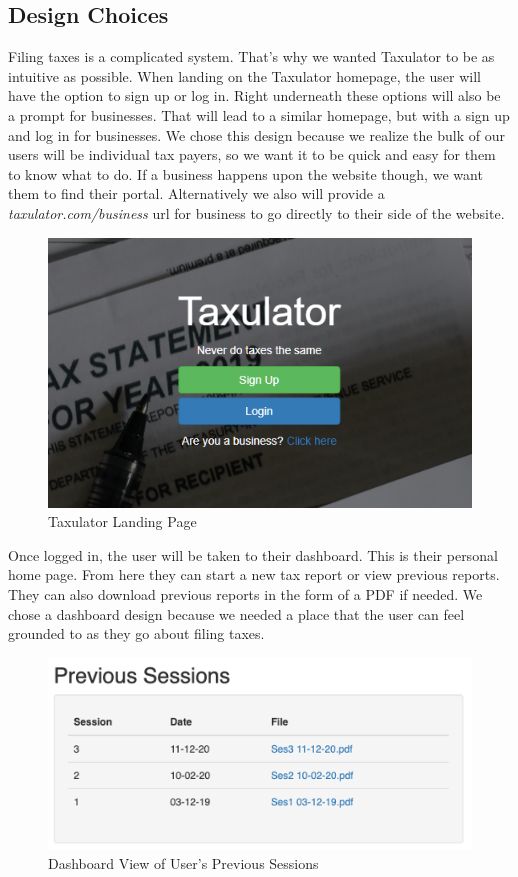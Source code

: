\documentclass[sigconf]{acmart}
\begin{document}
\subsection{Design Choices}
Filing taxes is a complicated system. That's why we wanted Taxulator to be as intuitive as possible. When landing on the Taxulator homepage, the user will have the option to sign up or log in. Right underneath these options will also be a prompt for businesses. That will lead to a similar homepage, but with a sign up and log in for businesses. We chose this design because we realize the bulk of our users will be individual tax payers, so we want it to be quick and easy for them to know what to do. If a business happens upon the website though, we want them to find their portal. Alternatively we also will provide a \textit{taxulator.com/business} url for business to go directly to their side of the website.

\begin{figure}[H]
 \label{Home}
  \centering
  \includegraphics[width=\linewidth]{Images/TaxulatorHome2.png}
  \caption{Taxulator Landing Page}
\end{figure}

Once logged in, the user will be taken to their dashboard. This is their personal home page. From here they can start a new tax report or view previous reports. They can also download previous reports in the form of a PDF if needed. We chose a dashboard design because we needed a place that the user can feel grounded to as they go about filing taxes.

\begin{figure}[H]
  \label{Dashboard}
  \centering
  \includegraphics[width=\linewidth]{Images/Dashboard.png}
  \caption{Dashboard View of User’s Previous Sessions}
\end{figure}
\end{document}
